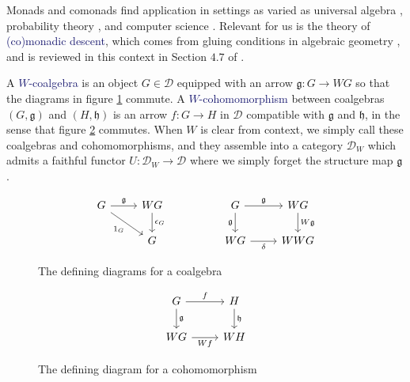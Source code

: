 \documentclass[12pt]{article}
\theoremstyle{definition}
\theoremstyle{theorem}
\newcommand*{\catVarFont}[1]{\mathcal{#1}}
\newcommand{\catD}{\catVarFont{D}}
\newcommand*{\important}[1]{\textcolor{MidnightBlue}{#1}}
\begin{document}
Monads and comonads find application in settings as varied as universal algebra 
\cite{borceuxCategoriesStructures1994,
adamekAlgebraicTheoriesCategorical2011,
bojanczykRecognisableLanguagesMonads2015,
awodeyCoalgebraicDualBirkhoff2000,
hylandCategoryTheoreticUnderstanding2007},
probability theory 
\cite{giryCategoricalApproachProbability1982,
culbertsonCategoricalFoundationBayesian2014,
leinsterCODENSITYULTRAFILTERMONAD2013},
and computer science 
\cite{moggiNotionsComputationMonads1991,
depaivaDialecticaComonads2021,
ghaniAlgebrasCoalgebrasMonads2001,
ruttenUniversalCoalgebraTheory2000}.
Relevant for us is the theory of \important{(co)monadic descent}, 
which comes from gluing conditions in algebraic geometry
\cite{grothendieckTechniqueDescenteTheoremes1958}, and is reviewed in 
this context in Section $4.7$ of \cite{borceuxCategoriesStructures1994}.

A \important{$W$-coalgebra} is an object
$G \in \catD$ equipped with an arrow $\mathfrak{g} : G \to WG$ so that the
diagrams in figure \ref{fig:coalg} commute. A \important{$W$-cohomomorphism}
between coalgebras $(G,\mathfrak{g})$ and $(H,\mathfrak{h})$ is an arrow $f : G \to H$
in $\mathcal{D}$ compatible with $\mathfrak{g}$ and $\mathfrak{h}$, in the sense that 
figure \ref{fig:cohom} commutes. When $W$ is clear from context, we simply call these
coalgebras and cohomomorphisms, and they assemble into a category $\catD_W$
which admits a faithful functor $U : \catD_W \to \catD$ where we 
simply forget the structure map $\mathfrak{g}$.

\begin{figure}
    \[
        \begin{tikzcd}
        G & WG && G & WG \\
        & G && WG & WWG
        \arrow["\mathfrak{g}", from=1-1, to=1-2]
        \arrow["{\epsilon_G}", from=1-2, to=2-2]
        \arrow["{1_G}"', from=1-1, to=2-2]
        \arrow["\mathfrak{g}"', from=1-4, to=2-4]
        \arrow["\mathfrak{g}", from=1-4, to=1-5]
        \arrow["\delta"', from=2-4, to=2-5]
        \arrow["W\mathfrak{g}", from=1-5, to=2-5]
        \end{tikzcd}
    \]
    \caption{The defining diagrams for a coalgebra}
    \label{fig:coalg}
\end{figure}

\begin{figure}
    \[
        \begin{tikzcd}
        G & H \\
        WG & WH
        \arrow["\mathfrak{g}", from=1-1, to=2-1]
        \arrow["\mathfrak{h}", from=1-2, to=2-2]
        \arrow["f", from=1-1, to=1-2]
        \arrow["Wf"', from=2-1, to=2-2]
        \end{tikzcd}
    \]    
    \caption{The defining diagram for a cohomomorphism}
    \label{fig:cohom}
\end{figure}
\end{document}
